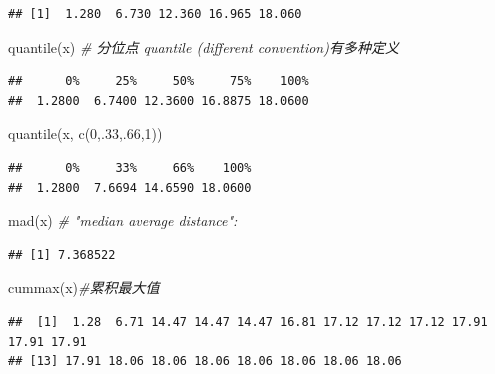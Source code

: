 \documentclass[
]{book}
\newenvironment{Shaded}{\begin{snugshade}}{\end{snugshade}}
\newcommand{\CommentTok}[1]{\textcolor[rgb]{0.56,0.35,0.01}{\textit{#1}}}
\newcommand{\DecValTok}[1]{\textcolor[rgb]{0.00,0.00,0.81}{#1}}
\newcommand{\FunctionTok}[1]{\textcolor[rgb]{0.00,0.00,0.00}{#1}}
\newcommand{\NormalTok}[1]{#1}
\begin{document}
\begin{verbatim}
## [1]  1.280  6.730 12.360 16.965 18.060
\end{verbatim}

\begin{Shaded}
\begin{Highlighting}[]
\FunctionTok{quantile}\NormalTok{(x) }\CommentTok{\# 分位点 quantile (different convention)有多种定义}
\end{Highlighting}
\end{Shaded}

\begin{verbatim}
##      0%     25%     50%     75%    100% 
##  1.2800  6.7400 12.3600 16.8875 18.0600
\end{verbatim}

\begin{Shaded}
\begin{Highlighting}[]
\FunctionTok{quantile}\NormalTok{(x, }\FunctionTok{c}\NormalTok{(}\DecValTok{0}\NormalTok{,.}\DecValTok{33}\NormalTok{,.}\DecValTok{66}\NormalTok{,}\DecValTok{1}\NormalTok{))}
\end{Highlighting}
\end{Shaded}

\begin{verbatim}
##      0%     33%     66%    100% 
##  1.2800  7.6694 14.6590 18.0600
\end{verbatim}

\begin{Shaded}
\begin{Highlighting}[]
\FunctionTok{mad}\NormalTok{(x) }\CommentTok{\# "median average distance":}
\end{Highlighting}
\end{Shaded}

\begin{verbatim}
## [1] 7.368522
\end{verbatim}

\begin{Shaded}
\begin{Highlighting}[]
\FunctionTok{cummax}\NormalTok{(x)}\CommentTok{\#累积最大值}
\end{Highlighting}
\end{Shaded}

\begin{verbatim}
##  [1]  1.28  6.71 14.47 14.47 14.47 16.81 17.12 17.12 17.12 17.91 17.91 17.91
## [13] 17.91 18.06 18.06 18.06 18.06 18.06 18.06 18.06
\end{verbatim}
\end{document}
